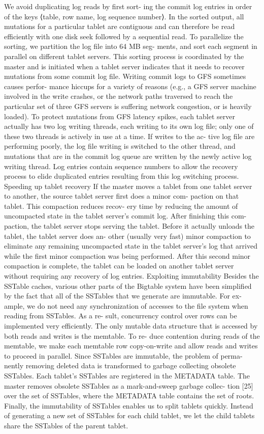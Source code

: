 \documentclass[twocolumn]{article}
\begin{document}
We avoid duplicating log reads by first sort- ing the commit log entries in order of the keys ⟨table, row name, log sequence number⟩. In the sorted output, all mutations for a particular tablet are contiguous and can therefore be read efficiently with one disk seek followed by a sequential read. To parallelize the sorting, we partition the log file into 64 MB seg- ments, and sort each segment in parallel on different tablet servers. This sorting process is coordinated by the master and is initiated when a tablet server indicates that it needs to recover mutations from some commit log file.
Writing commit logs to GFS sometimes causes perfor- mance hiccups for a variety of reasons (e.g., a GFS server machine involved in the write crashes, or the network paths traversed to reach the particular set of three GFS servers is suffering network congestion, or is heavily loaded). To protect mutations from GFS latency spikes, each tablet server actually has two log writing threads, each writing to its own log file; only one of these two threads is actively in use at a time. If writes to the ac- tive log file are performing poorly, the log file writing is switched to the other thread, and mutations that are in the commit log queue are written by the newly active log writing thread. Log entries contain sequence numbers to allow the recovery process to elide duplicated entries resulting from this log switching process.
Speeding up tablet recovery
If the master moves a tablet from one tablet server to another, the source tablet server first does a minor com- paction on that tablet. This compaction reduces recov- ery time by reducing the amount of uncompacted state in the tablet server’s commit log. After finishing this com- paction, the tablet server stops serving the tablet. Before it actually unloads the tablet, the tablet server does an- other (usually very fast) minor compaction to eliminate any remaining uncompacted state in the tablet server’s log that arrived while the first minor compaction was being performed. After this second minor compaction is complete, the tablet can be loaded on another tablet server without requiring any recovery of log entries.
Exploiting immutability
Besides the SSTable caches, various other parts of the Bigtable system have been simplified by the fact that all
of the SSTables that we generate are immutable. For ex- ample, we do not need any synchronization of accesses to the file system when reading from SSTables. As a re- sult, concurrency control over rows can be implemented very efficiently. The only mutable data structure that is accessed by both reads and writes is the memtable. To re- duce contention during reads of the memtable, we make each memtable row copy-on-write and allow reads and writes to proceed in parallel.
Since SSTables are immutable, the problem of perma- nently removing deleted data is transformed to garbage collecting obsolete SSTables. Each tablet’s SSTables are registered in the METADATA table. The master removes obsolete SSTables as a mark-and-sweep garbage collec- tion [25] over the set of SSTables, where the METADATA table contains the set of roots.
Finally, the immutability of SSTables enables us to split tablets quickly. Instead of generating a new set of SSTables for each child tablet, we let the child tablets share the SSTables of the parent tablet.
\end{document}
